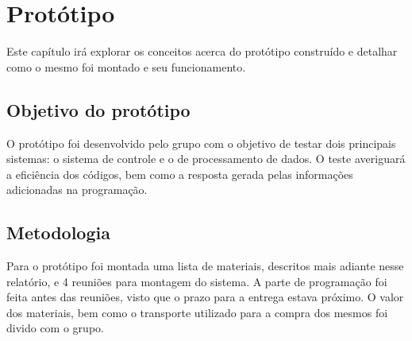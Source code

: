 \chapter{Protótipo}

Este capítulo irá explorar os conceitos acerca do protótipo construído e detalhar como o mesmo foi montado e seu funcionamento.

\section{Objetivo do protótipo}
O protótipo foi desenvolvido pelo grupo com o objetivo de testar dois principais sistemas: o sistema de controle e o de processamento de dados. O teste averiguará a eficiência dos códigos, bem como a resposta gerada pelas informações adicionadas na programação.
\section{Metodologia}
Para o protótipo foi montada uma lista de materiais, descritos mais adiante nesse relatório, e 4 reuniões para montagem do sistema. A parte de programação foi feita antes das reuniões, visto que o prazo para a entrega estava próximo. O valor dos materiais, bem como o transporte utilizado para a compra dos mesmos foi divido com o grupo.
